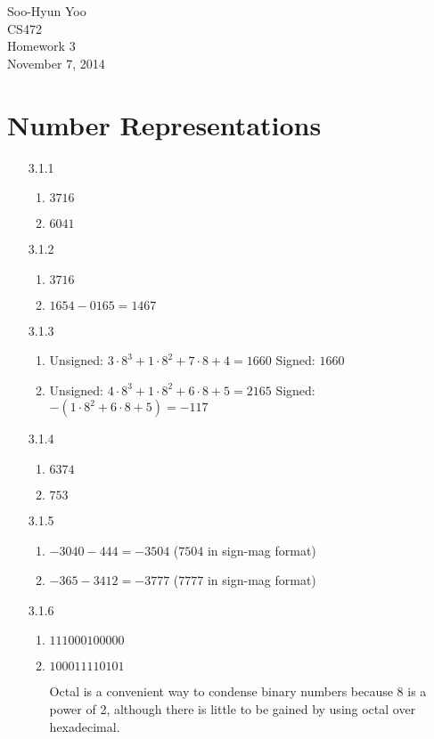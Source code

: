 \documentclass[12pt,letterpaper]{article}
\begin{document}
Soo-Hyun Yoo \\
CS472 \\
Homework 3 \\
November 7, 2014

\section*{Number Representations}

\begin{enumerate}
    \item[3.1.1]
        \begin{enumerate}
            \item $3716$
            \item $6041$
        \end{enumerate}
    \item[3.1.2]
        \begin{enumerate}
            \item $3716$
            \item $1654 - 0165 = 1467$
        \end{enumerate}
    \item[3.1.3]
        \begin{enumerate}
            \item Unsigned: $3\cdot8^3+1\cdot8^2+7\cdot8+4 = \boxed{1660}$  Signed: $\boxed{1660}$
            \item Unsigned: $4\cdot8^3+1\cdot8^2+6\cdot8+5 = \boxed{2165}$  Signed: $-(1\cdot8^2+6\cdot8+5) = \boxed{-117}$
        \end{enumerate}
    \item[3.1.4]
        \begin{enumerate}
            \item $6374$
            \item $753$
        \end{enumerate}
    \item[3.1.5]
        \begin{enumerate}
            \item $-3040 - 444 = \boxed{-3504}$ ($7504$ in sign-mag format)
            \item $-365 - 3412 = \boxed{-3777}$ ($7777$ in sign-mag format)
        \end{enumerate}
    \item[3.1.6]
        \begin{enumerate}
            \item $111000100000$
            \item $100011110101$

                Octal is a convenient way to condense binary numbers because
                8 is a power of 2, although there is little to be gained by
                using octal over hexadecimal.
        \end{enumerate}
\end{enumerate}
\end{document}
